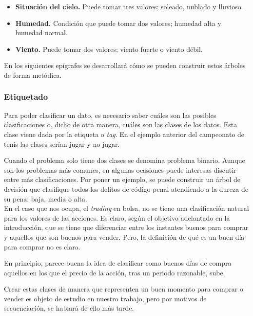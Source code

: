 			\begin{itemize}
				\item \textbf{Situaci\'on del cielo.} Puede tomar tres valores; soleado, nublado y lluvioso.
				
				\item \textbf{Humedad.} Condici\'on que puede tomar dos valores; humedad alta y humedad normal.
				
				\item \textbf{Viento.} Puede tomar dos valores; viento fuerte o viento d\'ebil.
			\end{itemize}
		
			En los siguientes ep\'igrafes se desarrollar\'a c\'omo se pueden construir estos \'arboles de forma met\'odica.
			 
			\subsubsection{Etiquetado}
			Para poder clasificar un dato, es necesario saber cu\'ales son las posibles clasificaciones o, dicho de otra manera, cu\'ales son las clases de los datos. Esta clase viene dada por la etiqueta o \textit{tag}. En el ejemplo anterior del campeonato de tenis las clases ser\'ian jugar y no jugar.
			
			Cuando el problema solo tiene dos clases se denomina problema binario. Aunque son los problemas m\'as comunes, en algunas ocasiones puede interesas discutir entre m\'as clasificaciones. Por poner un ejemplo, se puede construir un \'arbol de decisi\'on que clasifique todos los delitos de c\'odigo penal atendiendo a la dureza de su pena: baja, media o alta.\\
			
			En el caso que nos ocupa, el \textit{trading} en bolsa, no se tiene una clasificaci\'on natural para los valores de las acciones. Es claro, seg\'un el objetivo adelantado en la introducci\'on, que se tiene que diferenciar entre los instantes buenos para comprar y aquellos que son buenos para vender. Pero, la definici\'on de qu\'e es un buen d\'ia para comprar no es clara. 
			
			En principio, parece buena la idea de clasificar como buenos d\'ias de compra aquellos en los que el precio de la acci\'on, tras un periodo razonable, sube.  
			
			Crear estas clases de manera que representen un buen momento para comprar o vender es objeto de estudio en nuestro trabajo, pero por motivos de secuenciaci\'on, se hablar\'a de ello m\'as tarde.
			
